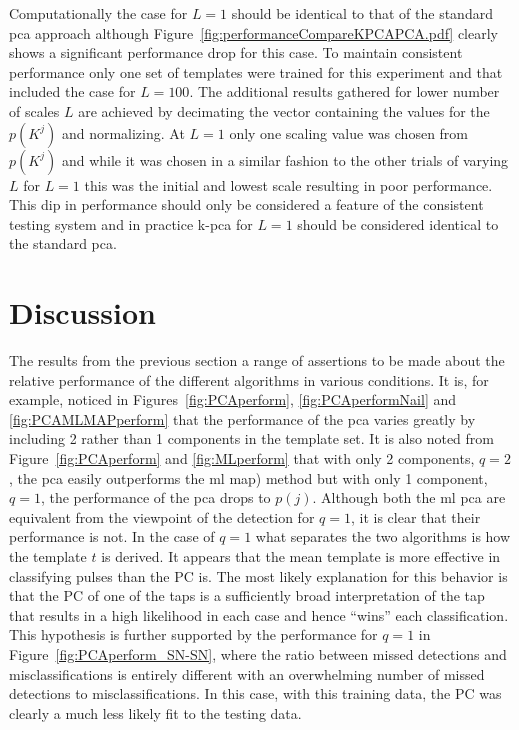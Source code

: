 Computationally the case for $L=1$ should be identical to that of the standard \DIFdelbegin {}\DIFdelend \DIFaddbegin \gls{pca} \DIFaddend approach although Figure~\ref{fig:performanceCompareKPCAPCA.pdf} clearly shows a significant performance drop for this case. To maintain consistent performance only one set of templates were trained for this experiment and that included the case for $L=100$. The additional results gathered for lower number of scales $L$ are achieved by decimating the vector containing the values for the $p(K^j)$ and normalizing. At $L=1$ only one scaling value was chosen from $p(K^j)$ and while it was chosen in a similar fashion to the other trials of varying $L$ for $L=1$ this was the initial and lowest scale resulting in poor performance. This dip in performance should only be considered a feature of the consistent testing system and in practice \DIFdelbegin {}\DIFdelend \DIFaddbegin \gls{k-pca} \DIFaddend for $L=1$ should be considered identical to the standard \DIFdelbegin {}\DIFdelend \DIFaddbegin \gls{pca}\DIFaddend .

\section{Discussion}

The results from the previous section \DIFdelbegin {}\DIFdelend \DIFaddbegin {}\DIFaddend a range of assertions to be made about the relative performance of the different algorithms in various conditions. It is, for example, noticed in Figures~\ref{fig:PCAperform}, \ref{fig:PCAperformNail} and \ref{fig:PCAMLMAPperform} that the performance of the \DIFdelbegin {}\DIFdelend \DIFaddbegin \gls{pca} \DIFaddend varies greatly by including 2 rather than 1 components in the template set. It is also noted from Figure~\ref{fig:PCAperform} and \ref{fig:MLperform} that with only 2 components, $q=2$, the \DIFdelbegin {}\DIFdelend \DIFaddbegin \gls{pca} \DIFaddend easily outperforms the \DIFdelbegin {}\DIFdelend \DIFaddbegin \gls{ml} \gls{map}\DIFaddend ) method but with only 1 component, $q=1$, the performance of the \DIFdelbegin {}\DIFdelend \DIFaddbegin \gls{pca} \DIFaddend drops to $p(j)$. Although both the \DIFdelbegin {}\DIFdelend \DIFaddbegin \gls{ml} \gls{pca} \DIFaddend are equivalent from the viewpoint of the detection for $q=1$, it is clear that their performance is not. In the case of $q=1$ what separates the two algorithms is how the template $t$ is derived. It appears that the mean template is more effective in classifying pulses than the PC is. The most likely explanation for this behavior is that the PC of one of the taps is a sufficiently broad interpretation of the tap that results in a high likelihood in each case and hence ``wins'' each classification. This hypothesis is further supported by the performance for $q=1$ in Figure~\ref{fig:PCAperform_SN-SN}, where the ratio between missed detections and misclassifications is entirely different with an overwhelming number of missed detections to misclassifications. In this case, with this training data, the PC was clearly a much less likely fit to the testing data.

